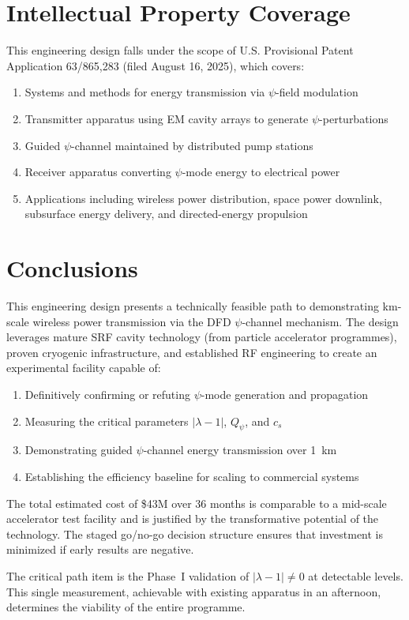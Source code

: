 \documentclass[11pt,letterpaper]{article}
\begin{document}
\section{Intellectual Property Coverage}

This engineering design falls under the scope of U.S. Provisional
Patent Application 63/865,283 (filed August 16, 2025), which covers:

\begin{enumerate}
\item Systems and methods for energy transmission via $\psi$-field modulation
\item Transmitter apparatus using EM cavity arrays to generate $\psi$-perturbations
\item Guided $\psi$-channel maintained by distributed pump stations
\item Receiver apparatus converting $\psi$-mode energy to electrical power
\item Applications including wireless power distribution, space power downlink,
subsurface energy delivery, and directed-energy propulsion
\end{enumerate}

\section{Conclusions}

This engineering design presents a technically feasible path to demonstrating
km-scale wireless power transmission via the DFD $\psi$-channel mechanism.
The design leverages mature SRF cavity technology (from particle accelerator
programmes), proven cryogenic infrastructure, and established RF engineering
to create an experimental facility capable of:

\begin{enumerate}
\item Definitively confirming or refuting $\psi$-mode generation and propagation
\item Measuring the critical parameters $|\lambda - 1|$, $Q_\psi$, and $c_s$
\item Demonstrating guided $\psi$-channel energy transmission over 1~km
\item Establishing the efficiency baseline for scaling to commercial systems
\end{enumerate}

The total estimated cost of \$43M over 36 months is comparable to a
mid-scale accelerator test facility and is justified by the transformative
potential of the technology. The staged go/no-go decision structure ensures
that investment is minimized if early results are negative.

The critical path item is the Phase~I validation of $|\lambda - 1| \neq 0$
at detectable levels. This single measurement, achievable with existing
apparatus in an afternoon, determines the viability of the entire programme.
\end{document}
